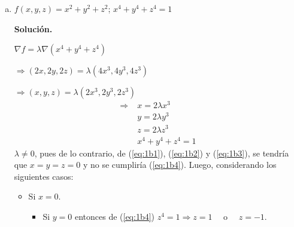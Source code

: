 \documentclass[fleqn, 12pt]{article}
\begin{document}
\begin{list}{\bfseries Ejercicio}{ \addtolength{\itemindent}{-1mm}%
    \addtolength{\labelsep}{-1mm}%
    \addtolength{\leftmargin}{-1cm}%
    \addtolength{\labelwidth}{-1cm} }
\begin{enumerate}[a)]
        $ f(2,1) = 2^2 \cdot 1 = 4 = (-2)^2 \cdot 1 = f(-2,1) $

        $ f(2,-1) = 2^2 \cdot -1 = -4 = (-2)^2 \cdot -1 = f(-2,-1) $

        Por lo tanto, el valor máximo de $ f $ es $ 4 $ y su valor mínimo es $ -4 $.
        \item $ f(x,y,z) = x^2 + y^2 + z^2 $; \; $ x^4 + y^4 + z^4 = 1 $
        
        \textbf{Solución.}

        $ \nabla f = \lambda \nabla (x^4 + y^4 + z^4) $

        $ \Longrightarrow (2x, 2y, 2z) = \lambda (4x^3, 4y^3, 4z^3) $

        $ \Longrightarrow (x, y, z) = \lambda (2x^3, 2y^3, 2z^3) $
        \begin{align}
            \Longrightarrow \; & x = 2 \lambda x^3 \label{eq:1b1} \\
            & y = 2 \lambda y^3 \label{eq:1b2} \\
            & z = 2 \lambda z^3 \label{eq:1b3} \\
            & x^4 + y^4 + z^4 = 1 \label{eq:1b4}
        \end{align}
        $ \lambda \neq 0 $, pues de lo contrario, de (\ref{eq:1b1}), (\ref{eq:1b2}) y (\ref{eq:1b3}), se tendría que $ x = y = z = 0 $ y no se cumpliría (\ref{eq:1b4}). Luego, considerando los siguientes casos:

        \begin{itemize}
            \item Si $ x = 0 $.
            \begin{itemize}
                \item Si $ y = 0 $ entonces de (\ref{eq:1b4}) \; $ z^4 = 1 \Longrightarrow z = 1 \quad $ o $ \quad z = -1 $.
                

\end{itemize}
\end{itemize}
\end{enumerate}
\end{list}
\end{document}
